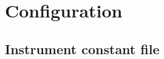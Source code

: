 \documentclass[./main.tex]{subfiles}
\begin{document}
 
\section{Configuration}
\subsection{Instrument constant file}
\begin{center}
	
\end{center}
\end{document}
